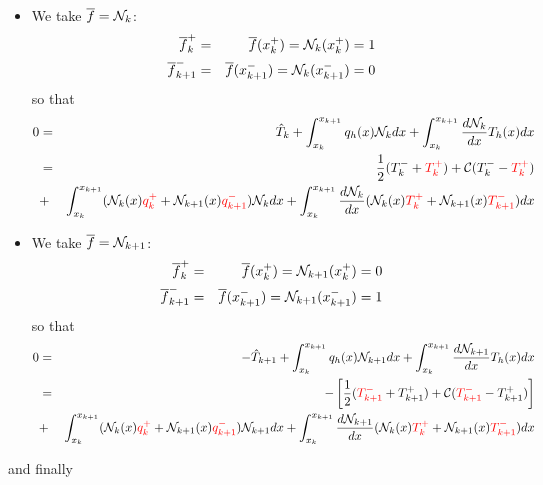 \begin{itemize}
\begin{itemize}
\item We take $\overline{f}={\mathcal{N}}_k$: 
\begin{eqnarray}
\overline{f}_k^+&=&\overline{f}(x_k^+)= {\mathcal{N}}_k(x_k^+) =1 \nonumber\\
\overline{f}_{k+1}^-&=&\overline{f}(x_{k+1}^-) = {\mathcal{N}}_k(x_{k+1}^-) = 0\nonumber
\end{eqnarray}
so that 
\begin{eqnarray}
0
&=& \hat{T}_k     
+ \int_{x_k}^{x_{k+1}}  q_h(x) {\mathcal{N}}_k dx
+ \int_{x_k}^{x_{k+1}} \frac{d{\mathcal{N}}_k}{dx} T_h(x) dx  \nonumber\\
&=& 
\frac{1}{2}(T_k^-+{\color{red}T_k^+}) + {\cal C} (T_k^- - {\color{red}T_k^+}) \nonumber\\
&+& \int_{x_k}^{x_{k+1}}  ({\mathcal{N}}_k(x) {\color{red}q_k^+} + {\mathcal{N}}_{k+1}(x) {\color{red}q_{k+1}^-}) {\mathcal{N}}_k dx
+ \int_{x_k}^{x_{k+1}} \frac{d{\mathcal{N}}_k}{dx} ({\mathcal{N}}_k(x) {\color{red}T_k^+} + {\mathcal{N}}_{k+1}(x) {\color{red}T_{k+1}^-})   dx 
\label{eq:dg5}
\end{eqnarray}

\item We take $\overline{f}={\mathcal{N}}_{k+1}$:
\begin{eqnarray}
\overline{f}_k^+&=&\overline{f}(x_k^+) = {\mathcal{N}}_{k+1}(x_k^+) = 0 \nonumber\\
\overline{f}_{k+1}^-&=&\overline{f}(x_{k+1}^-) = {\mathcal{N}}_{k+1}(x_{k+1}^-) =1 \nonumber
\end{eqnarray}
so that 
\begin{eqnarray}
0
&=& -\hat{T}_{k+1} 
+ \int_{x_k}^{x_{k+1}}  q_h(x) {\mathcal{N}}_{k+1} dx
+ \int_{x_k}^{x_{k+1}} \frac{d{\mathcal{N}}_{k+1} }{dx} T_h(x) dx  \nonumber\\
&=&-\left[\frac{1}{2}({\color{red}T_{k+1}^-}+T_{k+1}^+) + {\cal C}({\color{red}T_{k+1}^-} -T_{k+1}^+)\right]\\
&+& \int_{x_k}^{x_{k+1}} ({\mathcal{N}}_k(x) {\color{red}q_k^+} + {\mathcal{N}}_{k+1}(x) {\color{red}q_{k+1}^-})  {\mathcal{N}}_{k+1} dx
+ \int_{x_k}^{x_{k+1}} \frac{d{\mathcal{N}}_{k+1} }{dx} ({\mathcal{N}}_k(x) {\color{red} T_k^+} + {\mathcal{N}}_{k+1}(x) {\color{red}T_{k+1}^-}) dx 
\label{eq:dg7}
\end{eqnarray}



 
\end{itemize}

and finally 


\end{itemize}
